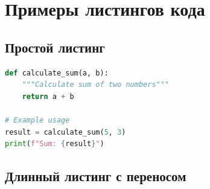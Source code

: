 \section{Примеры листингов кода}

\subsection{Простой листинг}

\begin{lstlisting}[language=Python, caption={Пример простого алгоритма}, label={lst:simple_algorithm}]
def calculate_sum(a, b):
    """Calculate sum of two numbers"""
    return a + b

# Example usage
result = calculate_sum(5, 3)
print(f"Sum: {result}")
\end{lstlisting}

\subsection{Длинный листинг с переносом}

